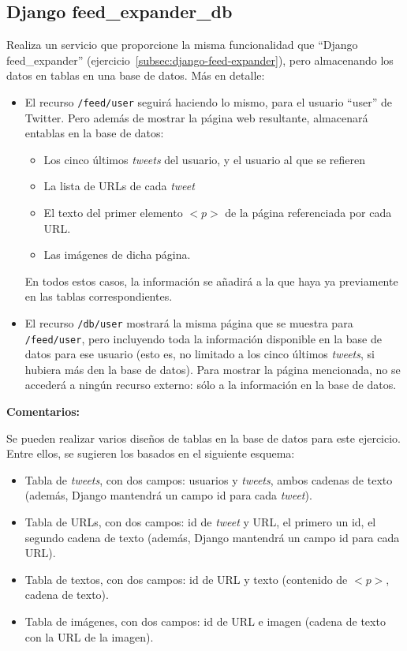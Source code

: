 \subsection{Django feed\_expander\_db}
\label{subsec:django-feed-expander-db}

Realiza un servicio que proporcione la misma funcionalidad que ``Django feed\_expander'' (ejercicio~\ref{subsec:django-feed-expander}), pero almacenando los datos en tablas en una base de datos. Más en detalle:

\begin{itemize}
\item El recurso \verb|/feed/user| seguirá haciendo lo mismo, para el usuario ``user'' de Twitter. Pero además de mostrar la página web resultante, almacenará entablas en la base de datos:

  \begin{itemize}
  \item Los cinco últimos \emph{tweets} del usuario, y el usuario al que se refieren
  \item La lista de URLs de cada \emph{tweet}
  \item El texto del primer elemento $<p>$ de la página referenciada por cada URL.
  \item Las imágenes de dicha página.
  \end{itemize}

En todos estos casos, la información se añadirá a la que haya ya previamente en las tablas correspondientes.

\item El recurso \verb|/db/user| mostrará la misma página que se muestra para \verb|/feed/user|, pero incluyendo toda la información disponible en la base de datos para ese usuario (esto es, no limitado a los cinco últimos \emph{tweets}, si hubiera más den la base de datos). Para mostrar la página mencionada, no se accederá a ningún recurso externo: sólo a la información en la base de datos.
\end{itemize}

\textbf{Comentarios:}

Se pueden realizar varios diseños de tablas en la base de datos para este ejercicio. Entre ellos, se sugieren los basados en el siguiente esquema:

\begin{itemize}
\item Tabla de \emph{tweets}, con dos campos: usuarios y \emph{tweets}, ambos cadenas de texto (además, Django mantendrá un campo id para cada \emph{tweet}).
\item Tabla de URLs, con dos campos: id de \emph{tweet} y URL, el primero un id, el segundo cadena de texto (además, Django mantendrá un campo id para cada URL).
\item Tabla de textos, con dos campos: id de URL y texto (contenido de $<p>$, cadena de texto).
\item Tabla de imágenes, con dos campos: id de URL e imagen (cadena de texto con la URL de la imagen).
\end{itemize}

